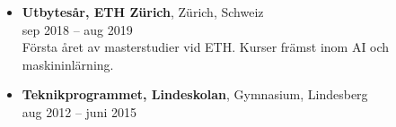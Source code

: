 \documentclass[12pt]{article}
\newcommand{\text}[2]{#2}
\newcommand{\text}[2]{#1}
\begin{document}
\begin{itemize}
    \item \text{
            \textbf{Exchange Year, ETH Zürich}, Zürich, Switzerland\\
        Sep 2018 -- Aug 2019\\
        }{
            \textbf{Utbytesår, ETH Zürich}, Zürich, Schweiz\\
        sep 2018 -- aug 2019\\
        }
        \text{
            First year of my master as an exchange student at ETH. Courses mainly in machine learning and AI.
        }{
            Första året av masterstudier vid ETH. Kurser främst inom AI och maskininlärning.
        }

    \item \text{
            \textbf{Technology Program, Lindeskolan}, Upper secondary school, Lindesberg\\
        Aug 2012 -- June 2015
        }{
            \textbf{Teknikprogrammet, Lindeskolan}, Gymnasium, Lindesberg\\
        aug 2012 -- juni 2015
        }
\end{itemize}
\end{document}
